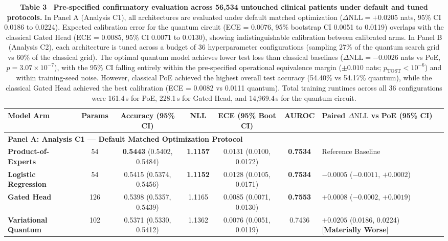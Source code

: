\documentclass[10pt,a4paper,twoside]{article}
\begin{document}
\begin{table}[t]
\centering
\small
\caption*{\textbf{\textsf{Table 3 \textbar\ Pre-specified confirmatory evaluation across 56,534 untouched clinical patients under default and tuned protocols.}} In Panel A (Analysis C1), all architectures are evaluated under default matched optimization ($\Delta\text{NLL} = +0.0205$ nats, 95\% CI 0.0186 to 0.0224). Expected calibration error for the quantum circuit (ECE = 0.0076, 95\% bootstrap CI 0.0051 to 0.0119) overlaps with the classical Gated Head (ECE = 0.0085, 95\% CI 0.0071 to 0.0130), showing indistinguishable calibration between calibrated arms. In Panel B (Analysis C2), each architecture is tuned across a budget of 36 hyperparameter configurations (sampling 27\% of the quantum search grid vs 60\% of the classical grid). The optimal quantum model achieves lower test loss than classical baselines ($\Delta\text{NLL} = -0.0026$ nats vs PoE, $p = 3.07 \times 10^{-7}$), with the 95\% CI falling entirely within the pre-specified operational equivalence margin ($\pm 0.010$ nats; $p_{\text{TOST}} < 10^{-6}$) and within training-seed noise. However, classical PoE achieved the highest overall test accuracy (54.40\% vs 54.17\% quantum), while the classical Gated Head achieved the best calibration (ECE = 0.0082 vs 0.0111 quantum). Total training runtimes across all 36 configurations were 161.4\,s for PoE, 228.1\,s for Gated Head, and 14,969.4\,s for the quantum circuit.}
\vspace{-4pt}
\begin{tabular}{l c c c c c l}
\toprule
\textbf{Model Arm} & \textbf{Params} & \textbf{Accuracy (95\% CI)} & \textbf{NLL} & \textbf{ECE (95\% Boot CI)} & \textbf{AUROC} & \textbf{Paired $\Delta\text{NLL}$ vs PoE (95\% CI)} \\
\midrule
\multicolumn{7}{l}{\textbf{Panel A: Analysis C1 --- Default Matched Optimization Protocol}} \\
\textbf{Product-of-Experts} & 54 & \textbf{0.5443} (0.5402, 0.5484) & \textbf{1.1157} & 0.0131 (0.0100, 0.0172) & \textbf{0.7534} & Reference Baseline \\
\textbf{Logistic Regression} & 54 & 0.5415 (0.5374, 0.5456) & \textbf{1.1152} & 0.0128 (0.0105, 0.0171) & \textbf{0.7534} & $-0.0005$ ($-0.0011$, $+0.0002$) \\
\textbf{Gated Head} & 126 & 0.5398 (0.5357, 0.5439) & 1.1165 & 0.0085 (0.0071, 0.0130) & \textbf{0.7553} & $+0.0008$ ($-0.0002$, $+0.0019$) \\
\textbf{Variational Quantum} & 102 & 0.5371 (0.5330, 0.5412) & 1.1362 & 0.0076 (0.0051, 0.0119) & 0.7436 & $\mathbf{+0.0205}$ (0.0186, 0.0224) [\textbf{\color{alertred}Materially Worse}] \\

\end{tabular}
\end{table}
\end{document}
